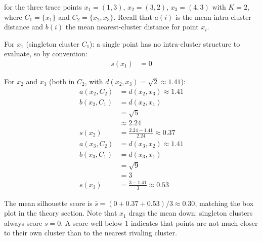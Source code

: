 \vspace{2.5em}
 for the three trace points $x_1{=}(1,3)$, $x_2{=}(3,2)$, $x_3{=}(4,3)$ with $K{=}2$, where $C_1{=}\{x_1\}$ and $C_2{=}\{x_2,x_3\}$.
Recall that $a(i)$ is the mean intra-cluster distance and $b(i)$ the mean nearest-cluster distance for point $x_i$.
\vspace{0.5em}

For $x_1$ (singleton cluster $C_1$): a single point has no intra-cluster structure to evaluate, so by convention:
\begin{align*}
    s(x_1) &= 0
\end{align*}


For $x_2$ and $x_3$ (both in $C_2$, with $d(x_2,x_3)=\sqrt{2}\approx1.41$):
\begin{align*}
    a(x_2, C_2) &= d(x_2,x_3) \approx 1.41 \\
    b(x_2, C_1) &= d(x_2,x_1) \\
                 &= \sqrt{5} \\
                 &\approx 2.24 \\
    s(x_2) &= \frac{2.24-1.41}{2.24} \approx 0.37 \\[6pt]
    a(x_3, C_2) &= d(x_3,x_2) \approx 1.41 \\
    b(x_3, C_1) &= d(x_3,x_1) \\
                 &= \sqrt{9} \\
                 &= 3 \\
    s(x_3) &= \frac{3-1.41}{3} \approx 0.53
\end{align*}

The mean silhouette score is $\bar{s} = (0 + 0.37 + 0.53)/3 \approx 0.30$, matching the box plot in the theory section.
Note that $x_1$ drags the mean down: singleton clusters always score $s{=}0$.
A score well below 1 indicates that points are not much closer to their own cluster than to the nearest rivaling cluster.



